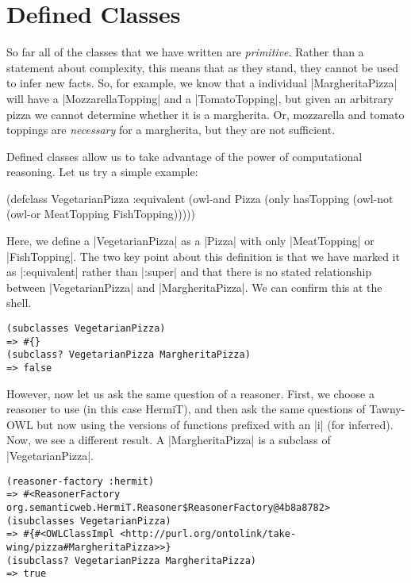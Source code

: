 \section{Defined Classes}
\label{defined}

So far all of the classes that we have written are \emph{primitive}. Rather
than a statement about complexity, this means that as they stand, they cannot
be used to infer new facts. So, for example, we know that a individual
|MargheritaPizza| will have a |MozzarellaTopping| and a |TomatoTopping|, but
given an arbitrary pizza we cannot determine whether it is a margherita. Or,
mozzarella and tomato toppings are \emph{necessary} for a margherita, but they
are not sufficient.

Defined classes allow us to take advantage of the power of computational
reasoning. Let us try a simple example:

\begin{tawny}
(defclass VegetarianPizza
  :equivalent
  (owl-and Pizza
           (only hasTopping
                 (owl-not (owl-or MeatTopping FishTopping)))))
\end{tawny}

Here, we define a |VegetarianPizza| as a |Pizza| with only
|MeatTopping| or |FishTopping|. The two key point about this
definition is that we have marked it as |:equivalent| rather than |:super| and
that there is no stated relationship between |VegetarianPizza| and
|MargheritaPizza|. We can confirm this at the shell. 


\begin{verbatim}
(subclasses VegetarianPizza)
=> #{}
(subclass? VegetarianPizza MargheritaPizza)
=> false
\end{verbatim}

However, now let us ask the same question of a reasoner. First, we choose a
reasoner to use (in this case HermiT), and then ask the same questions of
Tawny-OWL but now using the versions of functions prefixed with an |i| (for
inferred). Now, we see a different result. A |MargheritaPizza| is a subclass
of |VegetarianPizza|.

\begin{verbatim}
(reasoner-factory :hermit)
=> #<ReasonerFactory org.semanticweb.HermiT.Reasoner$ReasonerFactory@4b8a8782>
(isubclasses VegetarianPizza)
=> #{#<OWLClassImpl <http://purl.org/ontolink/take-wing/pizza#MargheritaPizza>>}
(isubclass? VegetarianPizza MargheritaPizza)
=> true
\end{verbatim}

